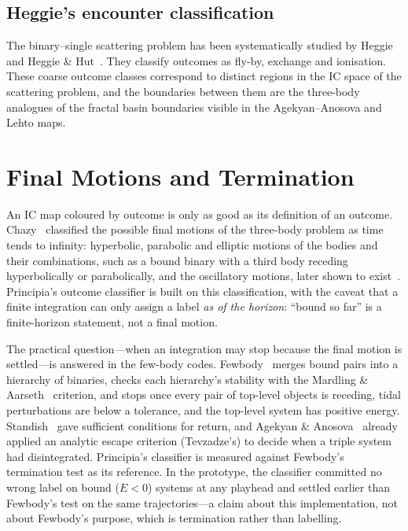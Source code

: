 \documentclass[11pt,a4paper]{article}
\begin{document}
\subsection{Heggie's encounter classification}

The binary--single scattering problem has been systematically studied by Heggie~\cite{heggie1975}
and Heggie \& Hut~\cite{heggie2003}.  They classify outcomes as fly-by, exchange and ionisation.
These coarse outcome classes correspond to distinct regions in the IC space of the scattering
problem, and the boundaries between them are the three-body analogues of the fractal basin
boundaries visible in the Agekyan--Anosova and Lehto maps.

\section{Final Motions and Termination}
\label{sec:final}

An IC map coloured by outcome is only as good as its definition of an outcome.  Chazy~\cite{chazy1922}
classified the possible final motions of the three-body problem as time tends to infinity:
hyperbolic, parabolic and elliptic motions of the bodies and their combinations, such as a bound
binary with a third body receding hyperbolically or parabolically, and the oscillatory motions,
later shown to exist~\cite{alekseev1969}.  Principia's outcome classifier
is built on this classification, with the caveat that a finite integration can only assign a
label \emph{as of the horizon}: ``bound so far'' is a finite-horizon statement, not a final motion.

The practical question---when an integration may stop because the final motion is
settled---is answered in the few-body codes.  Fewbody~\cite{fregeau2004} merges bound pairs into
a hierarchy of binaries, checks each hierarchy's stability with the Mardling \&
Aarseth~\cite{mardling2001} criterion, and stops once every pair of top-level objects is
receding, tidal perturbations are below a tolerance, and the top-level system has positive
energy.  Standish~\cite{standish1972} gave sufficient conditions for return, and Agekyan \&
Anosova~\cite{agekian1967} already applied an analytic escape criterion (Tevzadze's) to decide
when a triple system had disintegrated.  Principia's classifier is measured against Fewbody's
termination test as its reference.  In the prototype, the classifier committed no wrong label on
bound ($E<0$) systems at any playhead and settled earlier than Fewbody's test on the same
trajectories---a claim about this implementation, not about Fewbody's purpose, which is
termination rather than labelling.
\end{document}
